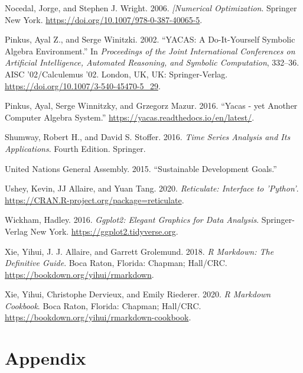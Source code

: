 \begin{CSLReferences}
\leavevmode{}%
Nocedal, Jorge, and Stephen J. Wright. 2006. \emph{{[}Numerical Optimization}. Springer New York. \url{https://doi.org/10.1007/978-0-387-40065-5}.

\leavevmode{}%
Pinkus, Ayal Z., and Serge Winitzki. 2002. {``{YACAS: A Do-It-Yourself Symbolic Algebra Environment}.''} In \emph{Proceedings of the Joint International Conferences on Artificial Intelligence, Automated Reasoning, and Symbolic Computation}, 332--36. AISC '02/Calculemus '02. London, UK, UK: Springer-Verlag. \url{https://doi.org/10.1007/3-540-45470-5_29}.

\leavevmode{}%
Pinkus, Ayal, Serge Winnitzky, and Grzegorz Mazur. 2016. {``Yacas - yet Another Computer Algebra System.''} \url{https://yacas.readthedocs.io/en/latest/}.

\leavevmode{}%
Shumway, Robert H., and David S. Stoﬀer. 2016. \emph{Time Series Analysis and Its Applications}. Fourth Edition. Springer.

\leavevmode{}%
United Nations General Assembly. 2015. {``Sustainable Development Goals.''}

\leavevmode{}%
Ushey, Kevin, JJ Allaire, and Yuan Tang. 2020. \emph{Reticulate: Interface to 'Python'}. \url{https://CRAN.R-project.org/package=reticulate}.

\leavevmode{}%
Wickham, Hadley. 2016. \emph{Ggplot2: Elegant Graphics for Data Analysis}. Springer-Verlag New York. \url{https://ggplot2.tidyverse.org}.

\leavevmode{}%
Xie, Yihui, J. J. Allaire, and Garrett Grolemund. 2018. \emph{R Markdown: The Definitive Guide}. Boca Raton, Florida: Chapman; Hall/CRC. \url{https://bookdown.org/yihui/rmarkdown}.

\leavevmode{}%
Xie, Yihui, Christophe Dervieux, and Emily Riederer. 2020. \emph{R Markdown Cookbook}. Boca Raton, Florida: Chapman; Hall/CRC. \url{https://bookdown.org/yihui/rmarkdown-cookbook}.

\end{CSLReferences}




\appendix

\hypertarget{appendix}{%
\section{Appendix}\label{appendix}}

